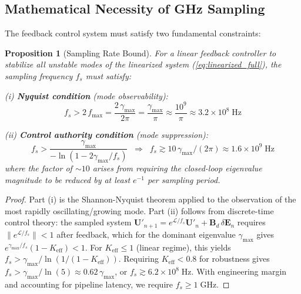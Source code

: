 \documentclass[12pt,twocolumn]{article}
\newtheorem{proposition}[theorem]{Proposition}
\newcommand{\ee}{\mathbf{E}}
\newcommand{\uu}{\mathbf{U}}
\newcommand{\Lop}{\mathcal{L}}
\begin{document}
\subsection{Mathematical Necessity of GHz Sampling}
\label{sec:stability:nyquist}

The feedback control system must satisfy two fundamental constraints:

\begin{proposition}[Sampling Rate Bound]
\label{prop:sampling}
For a linear feedback controller to stabilize all unstable modes
of the linearized system \textnormal{(\ref{eq:linearized_full})},
the sampling frequency $f_s$ must satisfy:

\noindent\textnormal{(i)} \textbf{Nyquist condition}
(mode observability):
\begin{equation}
  f_s > 2\,f_{\max}
  = \frac{2\,\gamma_{\max}}{2\pi}
  = \frac{\gamma_{\max}}{\pi}
  \approx \frac{10^9}{\pi}
  \approx 3.2 \times 10^8\;\mathrm{Hz}
  \label{eq:nyquist}
\end{equation}

\noindent\textnormal{(ii)} \textbf{Control authority condition}
(mode suppression):
\begin{equation}
  f_s > \frac{\gamma_{\max}}{-\ln(1 - 2\gamma_{\max}/f_s)}
  \;\;\Rightarrow\;\;
  f_s \gtrsim 10\,\gamma_{\max}/(2\pi)
  \approx 1.6 \times 10^9\;\mathrm{Hz}
  \label{eq:control_authority}
\end{equation}
where the factor of $\sim 10$ arises from requiring the closed-loop
eigenvalue magnitude to be reduced by at least $e^{-1}$ per sampling
period.
\end{proposition}

\begin{proof}
Part (i) is the Shannon-Nyquist theorem applied to the observation
of the most rapidly oscillating/growing mode. Part (ii) follows from
discrete-time control theory: the sampled system
$\uu'_{n+1} = e^{\Lop/f_s}\uu'_n + \mathbf{B}_d\,\delta\ee_n$
requires $\|e^{\Lop/f_s}\| < 1$ after feedback, which for the
dominant eigenvalue $\gamma_{\max}$ gives
$e^{\gamma_{\max}/f_s}(1 - K_{\mathrm{eff}}) < 1$. For
$K_{\mathrm{eff}} \leq 1$ (linear regime), this yields
$f_s > \gamma_{\max} / \ln(1/(1-K_{\mathrm{eff}}))$. Requiring
$K_{\mathrm{eff}} < 0.8$ for robustness gives
$f_s > \gamma_{\max}/\ln(5) \approx 0.62\,\gamma_{\max}$, or
$f_s \gtrsim 6.2 \times 10^8\;\mathrm{Hz}$. With engineering margin
and accounting for pipeline latency, we require
$f_s \geq 1\;\mathrm{GHz}$.
\end{proof}
\end{document}
